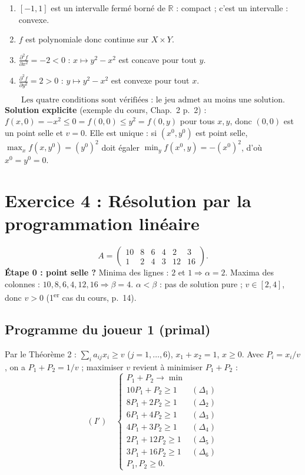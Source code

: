\documentclass[11pt,a4paper]{article}
\begin{document}
\begin{enumerate}[label=(\arabic*)]
\item $[-1,1]$ est un intervalle fermé borné de $\mathbb{R}$ : compact ; c'est un intervalle : convexe. \checkmark
\item $f$ est polynomiale donc continue sur $X\times Y$. \checkmark
\item $\frac{\partial^2 f}{\partial x^2}=-2<0$ : $x\mapsto y^2-x^2$ est concave pour tout $y$. \checkmark
\item $\frac{\partial^2 f}{\partial y^2}=2>0$ : $y\mapsto y^2-x^2$ est convexe pour tout $x$. \checkmark
\end{enumerate}
\[
\boxed{\text{Les quatre conditions sont vérifiées : le jeu admet au moins une solution.}}
\]
\textbf{Solution explicite} (exemple du cours, Chap.~2 p.~2) : $f(x,0)=-x^2\le 0=f(0,0)\le y^2=f(0,y)$ pour tous $x,y$, donc $(0,0)$ est un point selle et $v=0$. Elle est unique : si $(x^0,y^0)$ est point selle, $\max_x f(x,y^0)=(y^0)^2$ doit égaler $\min_y f(x^0,y)=-(x^0)^2$, d'où $x^0=y^0=0$.

\section*{Exercice 4 : Résolution par la programmation linéaire}

\[
A=\begin{pmatrix} 10 & 8 & 6 & 4 & 2 & 3\\ 1 & 2 & 4 & 3 & 12 & 16\end{pmatrix}.
\]
\textbf{Étape 0 : point selle ?} Minima des lignes : $2$ et $1\Rightarrow\alpha=2$. Maxima des colonnes : $10,8,6,4,12,16\Rightarrow\beta=4$. $\alpha<\beta$ : pas de solution pure ; $v\in[2,4]$, donc $v>0$ (1\textsuperscript{er} cas du cours, p.~14).

\subsection*{Programme du joueur 1 (primal)}
Par le Théorème 2 : $\sum_i a_{ij}x_i\ge v$ ($j=1,\dots,6$), $x_1+x_2=1$, $x\ge0$. Avec $P_i=x_i/v$, on a $P_1+P_2=1/v$ ; maximiser $v$ revient à minimiser $P_1+P_2$ :
\[
(I')\quad\begin{cases}
P_1+P_2\to\min\\
10P_1+P_2\ge1 & (\Delta_1)\\
8P_1+2P_2\ge1 & (\Delta_2)\\
6P_1+4P_2\ge1 & (\Delta_3)\\
4P_1+3P_2\ge1 & (\Delta_4)\\
2P_1+12P_2\ge1 & (\Delta_5)\\
3P_1+16P_2\ge1 & (\Delta_6)\\
P_1,P_2\ge0.
\end{cases}
\]
\end{document}
